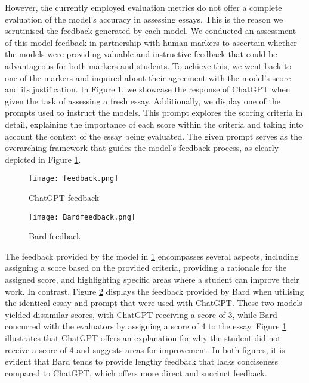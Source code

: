 \documentclass{article}
\begin{document}
However, the currently employed evaluation metrics do not offer a complete evaluation of the model's accuracy in assessing essays. This is the reason we scrutinised the feedback generated by each model. We conducted an assessment of this model feedback in partnership with human markers to ascertain whether the models were providing valuable and instructive feedback that could be advantageous for both markers and students. To achieve this, we went back to one of the markers and inquired about their agreement with the model's score and its justification. In Figure 1, we showcase the response of ChatGPT when given the task of assessing a fresh essay. Additionally, we display one of the prompts used to instruct the models. 
This prompt explores the scoring criteria in detail, explaining the importance of each score within the criteria and taking into account the context of the essay being evaluated. The given prompt serves as the overarching framework that guides the model's feedback process, as clearly depicted in Figure  \ref{fig:ChatGPT feedback}.

\begin{figure}[H]
  \centering
  \texttt{[image: feedback.png]}
  \caption{ChatGPT feedback}
  \label{fig:ChatGPT feedback}
\end{figure}

\begin{figure}[H]
  \centering
  \texttt{[image: Bardfeedback.png]}
  \caption{Bard feedback}
\label{fig:Bard feedback}
\end{figure}

The feedback provided by the model in \ref{fig:ChatGPT feedback} encompasses several aspects, including assigning a score based on the provided criteria, providing a rationale for the assigned score, and highlighting specific areas where a student can improve their work. In contrast, Figure \ref{fig:Bard feedback} displays the feedback provided by Bard when utilising the identical essay and prompt that were used with ChatGPT. 
These two models yielded dissimilar scores, with ChatGPT receiving a score of 3, while Bard concurred with the evaluators by assigning a score of 4 to the essay. Figure \ref{fig:ChatGPT feedback} illustrates that ChatGPT offers an explanation for why the student did not receive a score of 4 and suggests areas for improvement. In both figures, it is evident that Bard tends to provide lengthy feedback that lacks conciseness compared to ChatGPT, which offers more direct and succinct feedback.
\end{document}
